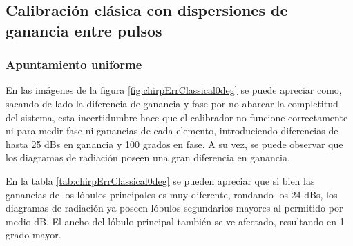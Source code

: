 \subsection{Calibración clásica con dispersiones de ganancia entre pulsos}

\subsubsection{Apuntamiento uniforme}

En las imágenes de la figura \ref{fig:chirpErrClassical0deg} se puede apreciar como, sacando de lado la diferencia de 
ganancia y fase por no abarcar la completitud del sistema, esta incertidumbre hace que el calibrador no funcione correctamente 
ni para medir fase ni ganancias de cada elemento, introduciendo diferencias de hasta 25 dBs en ganancia y 100 grados en fase.
A su vez, se puede observar que los diagramas de radiación poseen una gran diferencia en ganancia.

En la tabla \ref{tab:chirpErrClassical0deg} se pueden apreciar que si bien las ganancias de los lóbulos principales es muy 
diferente, rondando los 24 dBs, los diagramas de radiación ya poseen lóbulos segundarios mayores al permitido por medio dB. El 
ancho del lóbulo principal también se ve afectado, resultando en 1 grado mayor.


